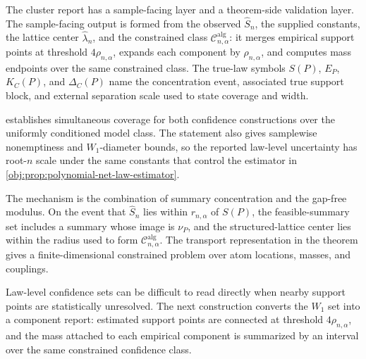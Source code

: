 \documentclass[11pt]{article}
\begin{document}
The cluster report has a sample-facing layer and a theorem-side validation layer. The sample-facing output is formed from the observed \(\widehat S_n\), the supplied constants, the lattice center \(\widehat\lambda_n\), and the constrained class \(\mathcal C^{\mathrm{alg}}_{n,\alpha}\): it merges empirical support points at threshold \(4\rho_{n,\alpha}\), expands each component by \(\rho_{n,\alpha}\), and computes mass endpoints over the same constrained class. The true-law symbols \(S(P)\), \(E_P\), \(K_C(P)\), and \(\Delta_C(P)\) name the concentration event, associated true support block, and external separation scale used to state coverage and width.

 establishes simultaneous coverage for both confidence constructions over the uniformly conditioned model class. The statement also gives samplewise nonemptiness and \(W_1\)-diameter bounds, so the reported law-level uncertainty has root-\(n\) scale under the same constants that control the estimator in \cref{obj:prop:polynomial-net-law-estimator}.

The mechanism is the combination of summary concentration and the gap-free modulus. On the event that \(\widehat S_n\) lies within \(r_{n,\alpha}\) of \(S(P)\), the feasible-summary set includes a summary whose image is \(\nu_P\), and the structured-lattice center lies within the radius used to form \(\mathcal C^{\mathrm{alg}}_{n,\alpha}\). The transport representation in the theorem gives a finite-dimensional constrained problem over atom locations, masses, and couplings.

Law-level confidence sets can be difficult to read directly when nearby support points are statistically unresolved. The next construction converts the \(W_1\) set into a component report: estimated support points are connected at threshold \(4\rho_{n,\alpha}\), and the mass attached to each empirical component is summarized by an interval over the same constrained confidence class.
\end{document}

